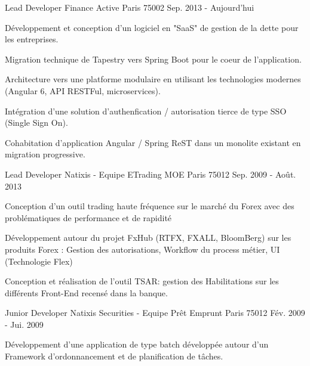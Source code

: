 \begin{cventries}
  \cventry
    {Lead Developer}
    {Finance Active}
    {Paris 75002}
    {Sep. 2013 - Aujourd'hui}
    {
      \begin{cvitems}
      	\item {Développement et conception d'un logiciel en "SaaS" de gestion de la dette pour les entreprises.}
        \item {Migration technique de Tapestry vers Spring Boot pour le coeur de l'application.}
         \item {Architecture vers une platforme modulaire en utilisant les technologies modernes (Angular 6, API RESTFul, microservices).}
        \item {Intégration d'une solution d'authenfication / autorisation tierce de type SSO (Single Sign On).}
        \item {Cohabitation d'application Angular / Spring ReST dans un monolite existant en migration progressive.}
      \end{cvitems}
    }
  \cventry
    {Lead Developer}
    {Natixis - Equipe ETrading MOE}
    {Paris 75012}
    {Sep. 2009 - Août. 2013}
    {
      \begin{cvitems}
         \item {Conception d'un outil trading haute fréquence sur le marché du Forex avec des problématiques de performance et de rapidité}
         \item {Développement autour du projet FxHub (RTFX, FXALL, BloomBerg) sur les produits Forex : Gestion des autorisations, Workflow du process métier, UI (Technologie Flex)}
        \item {Conception et réalisation de l'outil TSAR: gestion des Habilitations sur les différents Front-End recensé dans la banque.}
      \end{cvitems}
    }
  \cventry
    {Junior Developer}
    {Natixis Securities - Equipe Prêt Emprunt}
    {Paris 75012}
    {Fév. 2009 - Jui. 2009}
    {
      \begin{cvitems}
        \item {Développement d’une application de type batch développée autour d’un Framework d’ordonnancement et de planification de tâches.}
      \end{cvitems} 
    }
\end{cventries}
